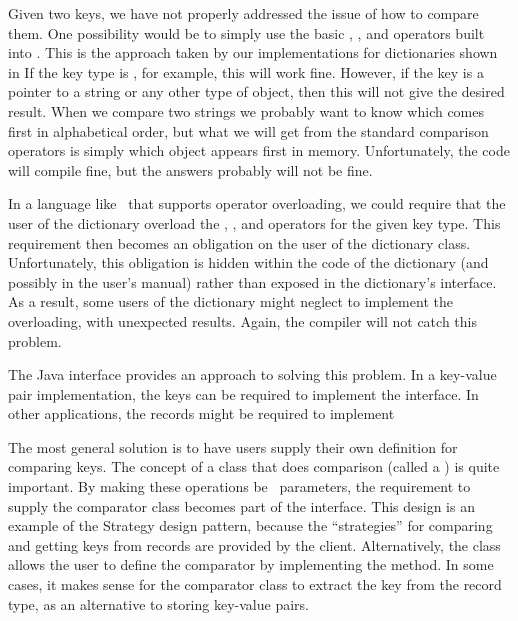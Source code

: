 Given two keys, we have not properly addressed the issue of
how to compare them.
One possibility would be to simply use the basic
\Cref{==}, \Cref{<=}, and \Cref{>=} operators built into \Lang.
This is the approach taken by our implementations for dictionaries
shown
in
If the key type is , for example, this will work fine.
However, if the key is a pointer to a string or any other type of
object, then this will not give the desired result.
When we compare two strings we probably want to know which comes first
in alphabetical order, but what we will get from the standard
comparison operators is simply which object appears first in memory.
Unfortunately, the code will compile fine, but the answers probably
will not be fine.

In a language like \LangCPP\ that supports operator overloading,
we could require that the user of the dictionary overload the
\Cref{==}, \Cref{<=}, and \Cref{>=} operators for the given key type.
This requirement then becomes an obligation on the user of the
dictionary class.
Unfortunately, this obligation is hidden within the code of the
dictionary (and possibly in the user's manual) rather than exposed in
the dictionary's interface.
As a result, some users of the dictionary might neglect to implement
the overloading, with unexpected results.
Again, the compiler will not catch this problem.

{The Java  interface provides an approach to solving
this problem.
In a key-value pair implementation, the keys can be required to
implement the  interface.
In other applications, the records might be required to implement
}{}

The most general solution is to have users supply their own
definition for comparing keys.
The concept of a class that does comparison (called a
) is quite important.
By making these operations be \Gen\ parameters, the requirement to
supply the comparator class becomes part of the
interface.
This design is an example of the Strategy design pattern, because the 
``strategies'' for comparing and getting keys from records
are provided by the client.
{Alternatively, the  class allows the user to define
the comparator by implementing the  method.}{}
In some cases, it makes sense for the comparator class to
extract the key from the record type, as an alternative to storing
key-value pairs.

